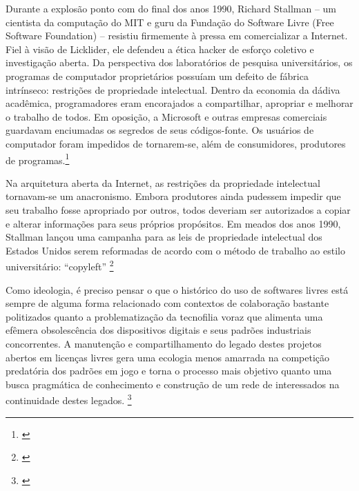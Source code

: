 \begin{citacao}
Durante a explosão ponto com do final dos anos 1990, Richard Stallman – um cientista da computação do MIT e guru da Fundação do Software Livre (Free Software Foundation) – resistiu firmemente à pressa em comercializar a Internet. Fiel à visão de Licklider, ele defendeu a ética hacker de esforço coletivo e investigação aberta. Da perspectiva dos laboratórios de pesquisa universitários, os programas de computador proprietários possuíam um defeito de fábrica intrínseco: restrições de propriedade intelectual. Dentro da economia da dádiva acadêmica, programadores eram encorajados a compartilhar, apropriar e melhorar o trabalho de todos. Em oposição, a Microsoft e outras empresas comerciais guardavam enciumadas os segredos de seus códigos-fonte. Os usuários de computador foram impedidos de tornarem-se, além de consumidores, produtores de programas.\footnote{\cite[367]{Barbrook2009}}
\end{citacao}


\begin{citacao}
Na arquitetura aberta da Internet, as restrições da propriedade intelectual tornavam-se um anacronismo. Embora produtores ainda pudessem impedir que seu trabalho fosse apropriado por outros, todos deveriam ser autorizados a copiar e alterar informações para seus próprios propósitos. Em meados dos anos 1990, Stallman lançou uma campanha para as leis de propriedade intelectual dos Estados Unidos serem reformadas de acordo com o método de trabalho ao estilo universitário: “copyleft” \footnote{\cite[368]{Barbrook2009}} \citeyear{Barbrook2009}
\end{citacao}


\begin{citacao}
Como ideologia, é preciso pensar o que o histórico do uso de softwares livres está sempre de alguma forma relacionado com contextos de colaboração bastante politizados quanto a problematização da tecnofilia voraz que alimenta uma efêmera obsolescência dos dispositivos digitais e seus padrões industriais concorrentes. A manutenção e compartilhamento do legado destes projetos abertos em licenças livres gera uma ecologia menos amarrada na competição predatória dos padrões em jogo e torna o processo mais objetivo quanto uma busca pragmática de conhecimento e construção de um rede de interessados na continuidade destes legados. \footnote{\cite{Rohde2014}}

\end{citacao}


